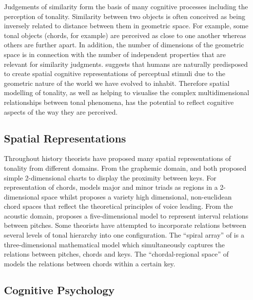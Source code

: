 \documentclass{article}
\begin{document}
Judgements of similarity form the basis of many cognitive processes
including the perception of tonality. Similarity between two objects
is often conceived as being inversely related to distance between them
in geometric space. For example, some tonal objects (chords, for
example) are perceived as close to one another whereas others are
further apart. In addition, the number of dimensions of the geometric
space is in connection with the number of independent properties that
are relevant for similarity judgments. \citet{Gardenfors1995} suggests
that humans are naturally predisposed to create spatial cognitive
representations of perceptual stimuli due to the geometric nature of
the world we have evolved to inhabit. Therefore spatial modelling of
tonality, as well as helping to visualise the complex multidimensional
relationships between tonal phenomena, has the potential to reflect
cognitive aspects of the way they are perceived.
\subsection{Spatial Representations}
\label{sec-5-2}

Throughout history theorists have proposed many spatial
representations of tonality from different domains. From the graphemic
domain, \citet{Weber} and \citet{Schoenberg} both proposed simple
2-dimensional charts to display the proximity between keys. For
representation of chords, \citet{Riemann} models major and minor
triads as regions in a 2-dimensional space whilst \citet{Tymoczko2011}
proposes a variety high dimensional, non-euclidean chord spaces that
reflect the theoretical principles of voice leading. From the acoustic
domain, \citet{Shepard1982} proposes a five-dimensional model to
represent interval relations between pitches. Some theorists have
attempted to incorporate relations between several levels of tonal
hierarchy into one configuration. The ``spiral array'' of
\citet{Chew2000a} is a three-dimensional mathematical model which
simultaneously captures the relations between pitches, chords and
keys. The ``chordal-regional space'' of \citet{Lerdahl2001a} models the
relations between chords within a certain key.
\subsection{Cognitive Psychology}
\label{sec-5-3}
\end{document}
